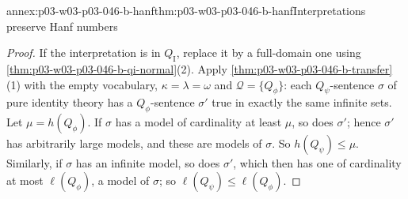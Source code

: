 \begin{annexitem}{annex:p03-w03-p03-046-b-hanf}{thm:p03-w03-p03-046-b-hanf}{Interpretations preserve Hanf numbers}
\begin{proof}
If the interpretation is in \(Q_{\mathrm I}\), replace it by a full-domain
one using \cref{thm:p03-w03-p03-046-b-qi-normal}(2). Apply
\cref{thm:p03-w03-p03-046-b-transfer}(1) with the empty vocabulary,
\(\kappa=\lambda=\omega\) and \(\mathcal Q=\{Q_\phi\}\): each
\(Q_\psi\)-sentence \(\sigma\) of pure identity theory has a
\(Q_\phi\)-sentence \(\sigma'\) true in exactly the same infinite sets. Let
\(\mu=h(Q_\phi)\). If \(\sigma\) has a model of cardinality at least
\(\mu\), so does \(\sigma'\); hence \(\sigma'\) has arbitrarily large
models, and these are models of \(\sigma\). So \(h(Q_\psi)\le\mu\).
Similarly, if \(\sigma\) has an infinite model, so does \(\sigma'\), which
then has one of cardinality at most \(\ell(Q_\phi)\), a model of
\(\sigma\); so \(\ell(Q_\psi)\le\ell(Q_\phi)\).
\end{proof}
\end{annexitem}


